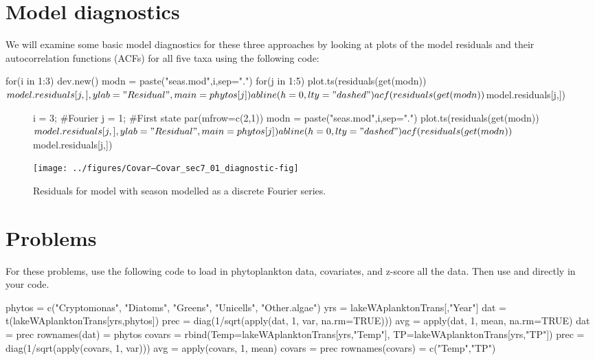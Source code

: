 \section{Model diagnostics}
We will examine some basic model diagnostics for these three approaches by looking at plots of the model residuals and their autocorrelation functions (ACFs) for all five taxa using the following code:

\begin{Schunk}
\begin{Sinput}
 for(i in 1:3) {
   dev.new()
   modn = paste("seas.mod",i,sep=".")
   for(j in 1:5) {
     plot.ts(residuals(get(modn))$model.residuals[j,], 
       ylab="Residual", main=phytos[j])
     abline(h=0, lty="dashed")
     acf(residuals(get(modn))$model.residuals[j,])
     }
   }
\end{Sinput}
\end{Schunk}

\begin{figure}[htp]
\begin{center}
\begin{Schunk}
\begin{Sinput}
   i = 3; #Fourier
   j = 1; #First state
   par(mfrow=c(2,1))
   modn = paste("seas.mod",i,sep=".")
   plot.ts(residuals(get(modn))$model.residuals[j,], 
       ylab="Residual", main=phytos[j])
   abline(h=0, lty="dashed")
   acf(residuals(get(modn))$model.residuals[j,])
\end{Sinput}
\end{Schunk}
\texttt{[image: ../figures/Covar--Covar\_sec7\_01\_diagnostic-fig]}
\end{center}
\caption{Residuals for model with season modelled as a discrete Fourier series. }
\label{fig:mon-effects-diagnostic}
\end{figure}



\clearpage
\renewcommand{\rightmark}{}
\section*{Problems}

For these problems, use the following code to load in phytoplankton data, covariates, and z-score all the data.  Then use \verb@dat@ and \verb@covars@ directly in your code.
\begin{Schunk}
\begin{Sinput}
 phytos = c("Cryptomonas", "Diatoms", "Greens", 
             "Unicells", "Other.algae")
 yrs = lakeWAplanktonTrans[,"Year"]%in%1985:1994
 dat = t(lakeWAplanktonTrans[yrs,phytos])
 prec = diag(1/sqrt(apply(dat, 1, var, na.rm=TRUE)))
 avg = apply(dat, 1, mean, na.rm=TRUE)
 dat = prec %*% (dat-avg)
 rownames(dat) = phytos
 covars = rbind(Temp=lakeWAplanktonTrans[yrs,"Temp"],
                TP=lakeWAplanktonTrans[yrs,"TP"])
 prec = diag(1/sqrt(apply(covars, 1, var)))
 avg = apply(covars, 1, mean)
 covars =  prec %*% (covars-avg)
 rownames(covars) = c("Temp","TP")
\end{Sinput}
\end{Schunk}

